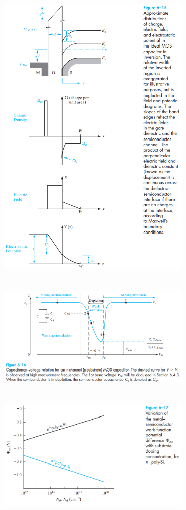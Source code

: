 \documentclass[8pt]{article}
\newcommand{\hl}{\noindent\makebox[\linewidth]{\rule{\textwidth}{0.2pt}}}
\begin{document}
\begin{center}
		\includegraphics[width=0.7\textwidth]{fig6-15} \\ \hl \\~\\
		\includegraphics[width=0.7\textwidth]{fig6-16} \\ \hl \\~\\
		\includegraphics[width=0.7\textwidth]{fig6-17} \\ \hl \\~\\

\end{center}
\end{document}
